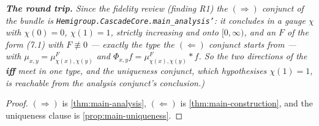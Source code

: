 \begin{theorem}
\emph{\textbf{The round trip.} Since the fidelity review (finding R1) the $(\Rightarrow)$ conjunct
of the bundle is \texttt{Hemigroup.CascadeCore.main\_analysis'}: it concludes in a gauge $\chi$
with $\chi(0) = 0$, $\chi(1) = 1$, strictly increasing and onto $[0,\infty)$, and an $F$ of the
form (7.1) with $F \not\equiv 0$ --- exactly the type the $(\Leftarrow)$ conjunct starts from ---
with $\mu_{x,y} = \mu^F_{\chi(x),\chi(y)}$ and $\Phi_{x,y} f = \mu^F_{\chi(x),\chi(y)} * f$. So
the two directions of the \textbf{iff} meet in one type, and the uniqueness conjunct, which
hypothesises $\chi(1) = 1$, is reachable from the analysis conjunct's conclusion.)}
\end{theorem}

\begin{proof}
\leanok
$(\Rightarrow)$ is \ref{thm:main-analysis}, $(\Leftarrow)$ is \ref{thm:main-construction}, and
the uniqueness clause is \ref{prop:main-uniqueness}.
\end{proof}

